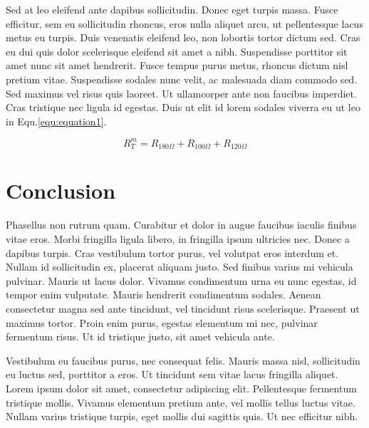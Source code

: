 \documentclass[11pt,oneside,openright]{book}
\begin{document}
Sed at leo eleifend ante dapibus sollicitudin. Donec eget turpis massa. Fusce efficitur, sem eu sollicitudin rhoncus, eros nulla aliquet arcu, ut pellentesque lacus metus eu turpis. Duis venenatis eleifend leo, non lobortis tortor dictum sed. Cras eu dui quis dolor scelerisque eleifend sit amet a nibh. Suspendisse porttitor sit amet nunc sit amet hendrerit. Fusce tempus purus metus, rhoncus dictum nisl pretium vitae. Suspendisse sodales nunc velit, ac malesuada diam commodo sed. Sed maximus vel risus quis laoreet. Ut ullamcorper ante non faucibus imperdiet. Cras tristique nec ligula id egestas. Duis ut elit id lorem sodales viverra eu ut leo in Equ.\ref{equ:equation1}.

\begin{equation}\label{equ:equation1}
R^m_T=R_{180\Omega}+R_{100\Omega}+R_{120\Omega}
\end{equation}

\chapter{Conclusion}\label{cpt:con}

Phasellus non rutrum quam. Curabitur et dolor in augue faucibus iaculis finibus vitae eros. Morbi fringilla ligula libero, in fringilla ipsum ultricies nec. Donec a dapibus turpis. Cras vestibulum tortor purus, vel volutpat eros interdum et. Nullam id sollicitudin ex, placerat aliquam justo. Sed finibus varius mi vehicula pulvinar. Mauris ut lacus dolor. Vivamus condimentum urna eu nunc egestas, id tempor enim vulputate. Mauris hendrerit condimentum sodales. Aenean consectetur magna sed ante tincidunt, vel tincidunt risus scelerisque. Praesent ut maximus tortor. Proin enim purus, egestas elementum mi nec, pulvinar fermentum risus. Ut id tristique justo, sit amet vehicula ante.

Vestibulum eu faucibus purus, nec consequat felis. Mauris massa nisl, sollicitudin eu luctus sed, porttitor a eros. Ut tincidunt sem vitae lacus fringilla aliquet. Lorem ipsum dolor sit amet, consectetur adipiscing elit. Pellentesque fermentum tristique mollis. Vivamus elementum pretium ante, vel mollis tellus luctus vitae. Nullam varius tristique turpis, eget mollis dui sagittis quis. Ut nec efficitur nibh.





\end{document}
